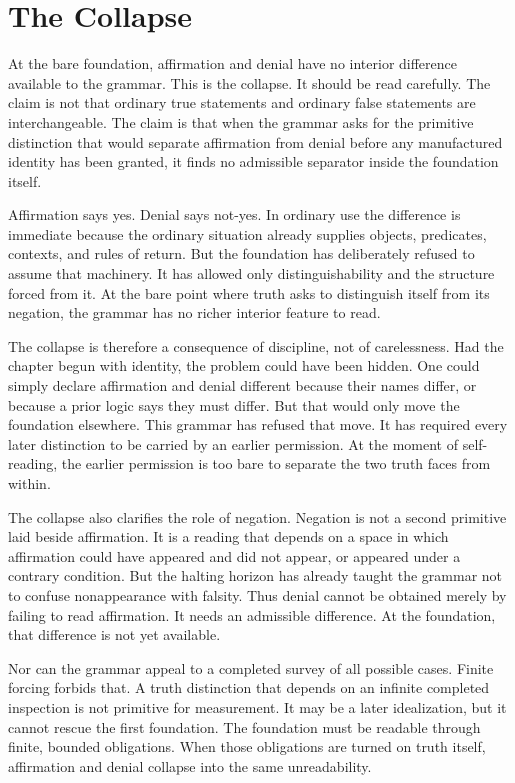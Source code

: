 \section{The Collapse}

At the bare foundation, affirmation and denial have no interior
difference available to the grammar. This is the collapse. It should be
read carefully. The claim is not that ordinary true statements and
ordinary false statements are interchangeable. The claim is that when
the grammar asks for the primitive distinction that would separate
affirmation from denial before any manufactured identity has been
granted, it finds no admissible separator inside the foundation itself.

Affirmation says yes. Denial says not-yes. In ordinary use the
difference is immediate because the ordinary situation already supplies
objects, predicates, contexts, and rules of return. But the foundation
has deliberately refused to assume that machinery. It has allowed only
distinguishability and the structure forced from it. At the bare point
where truth asks to distinguish itself from its negation, the grammar has
no richer interior feature to read.

The collapse is therefore a consequence of discipline, not of
carelessness. Had the chapter begun with identity, the problem could have
been hidden. One could simply declare affirmation and denial different
because their names differ, or because a prior logic says they must
differ. But that would only move the foundation elsewhere. This grammar
has refused that move. It has required every later distinction to be
carried by an earlier permission. At the moment of self-reading, the
earlier permission is too bare to separate the two truth faces from
within.

The collapse also clarifies the role of negation. Negation is not a
second primitive laid beside affirmation. It is a reading that depends
on a space in which affirmation could have appeared and did not appear,
or appeared under a contrary condition. But the halting horizon has
already taught the grammar not to confuse nonappearance with falsity.
Thus denial cannot be obtained merely by failing to read affirmation.
It needs an admissible difference. At the foundation, that difference is
not yet available.

Nor can the grammar appeal to a completed survey of all possible cases.
Finite forcing forbids that. A truth distinction that depends on an
infinite completed inspection is not primitive for measurement. It may
be a later idealization, but it cannot rescue the first foundation. The
foundation must be readable through finite, bounded obligations. When
those obligations are turned on truth itself, affirmation and denial
collapse into the same unreadability.

